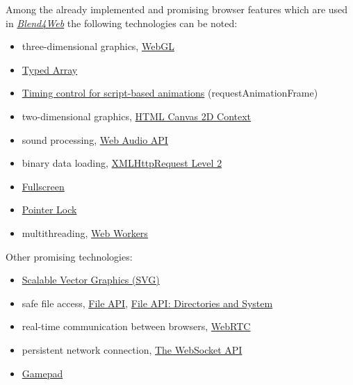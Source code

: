 \documentclass[a4paper,12pt,oneside]{sphinxmanual}
\begin{document}
Among the already implemented and promising browser features which are used in {\hyperref[about:about-product]{\emph{Blend4Web}}} the following technologies can be noted:
\begin{itemize}
\item {} 
three-dimensional graphics, \href{https://www.khronos.org/registry/webgl/specs/latest/}{WebGL}

\item {} 
\href{https://www.khronos.org/registry/typedarray/specs/latest/}{Typed Array}

\item {} 
\href{http://www.w3.org/TR/animation-timing/}{Timing control for script-based animations} (requestAnimationFrame)

\item {} 
two-dimensional graphics, \href{http://www.w3.org/TR/2dcontext/}{HTML Canvas 2D Context}

\item {} 
sound processing, \href{http://www.w3.org/TR/webaudio/}{Web Audio API}

\item {} 
binary data loading, \href{http://www.w3.org/TR/XMLHttpRequest/}{XMLHttpRequest Level 2}

\item {} 
\href{http://dvcs.w3.org/hg/fullscreen/raw-file/tip/Overview.html}{Fullscreen}

\item {} 
\href{http://dvcs.w3.org/hg/pointerlock/raw-file/default/index.html}{Pointer Lock}

\item {} 
multithreading, \href{http://www.w3.org/TR/workers/}{Web Workers}

\end{itemize}

Other promising technologies:
\begin{itemize}
\item {} 
\href{http://www.w3.org/TR/SVG/}{Scalable Vector Graphics (SVG)}

\item {} 
safe file access, \href{http://www.w3.org/TR/FileAPI/}{File API}, \href{http://www.w3.org/TR/file-system-api/}{File API: Directories and System}

\item {} 
real-time communication between browsers, \href{http://dev.w3.org/2011/webrtc/editor/webrtc.html}{WebRTC}

\item {} 
persistent network connection, \href{http://www.w3.org/TR/websockets/}{The WebSocket API}

\item {} 
\href{http://dvcs.w3.org/hg/gamepad/raw-file/default/gamepad.html}{Gamepad}

\end{itemize}
\end{document}
